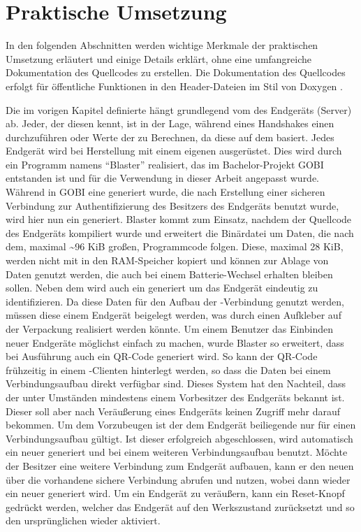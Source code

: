 \chapter{Praktische Umsetzung}

In den folgenden Abschnitten werden wichtige Merkmale der praktischen Umsetzung erläutert und einige Details erklärt,
ohne eine umfangreiche Dokumentation des Quellcodes zu erstellen. Die Dokumentation des Quellcodes erfolgt für öffentliche
Funktionen in den Header-Dateien im Stil von Doxygen \cite{doxygen}.

Die im vorigen Kapitel definierte  hängt grundlegend vom  des Endgeräts (Server) ab. Jeder, der diesen kennt, ist in
der Lage, während eines Handshakes einen  durchzuführen oder Werte der  zu Berechnen, da diese auf dem  basiert.
Jedes Endgerät wird bei Herstellung mit einem eigenen  ausgerüstet. Dies wird durch ein Programm namens "`Blaster"' realisiert, das
im Bachelor-Projekt GOBI entstanden ist und für die Verwendung in dieser Arbeit angepasst wurde. Während in GOBI eine  generiert wurde,
die nach Erstellung einer sicheren Verbindung zur Authentifizierung des Besitzers des Endgeräts benutzt wurde, wird hier nun ein 
generiert. Blaster kommt zum Einsatz, nachdem der Quellcode des Endgeräts kompiliert wurde und erweitert die Binärdatei um Daten, die nach dem,
maximal \textasciitilde 96 KiB großen, Programmcode folgen. Diese, maximal 28 KiB, werden nicht mit in den RAM-Speicher kopiert und können zur
Ablage von Daten genutzt werden, die auch bei einem Batterie-Wechsel erhalten bleiben sollen. Neben dem  wird auch ein 
generiert um das Endgerät eindeutig zu identifizieren. Da diese Daten für den Aufbau der -Verbindung genutzt werden, müssen diese
einem Endgerät beigelegt werden, was durch einen Aufkleber auf der Verpackung realisiert werden könnte. Um einem Benutzer das Einbinden neuer
Endgeräte möglichst einfach zu machen, wurde Blaster so erweitert, dass bei Ausführung auch ein QR-Code generiert wird. So kann der QR-Code
frühzeitig in einem -Clienten hinterlegt werden, so dass die Daten bei einem Verbindungsaufbau direkt verfügbar sind. Dieses System hat
den Nachteil, dass der  unter Umständen mindestens einem Vorbesitzer des Endgeräts bekannt ist. Dieser soll aber nach Veräußerung eines
Endgeräts keinen Zugriff mehr darauf bekommen. Um dem Vorzubeugen ist der dem Endgerät beiliegende  nur für einen Verbindungsaufbau
gültigt. Ist dieser erfolgreich abgeschlossen, wird automatisch ein neuer  generiert und bei einem weiteren Verbindungsaufbau benutzt.
Möchte der Besitzer eine weitere Verbindung zum Endgerät aufbauen, kann er den neuen  über die vorhandene sichere Verbindung abrufen
und nutzen, wobei dann wieder ein neuer  generiert wird. Um ein Endgerät zu veräußern, kann ein Reset-Knopf gedrückt werden, welcher das
Endgerät auf den Werkszustand zurücksetzt und so den ursprünglichen  wieder aktiviert.



